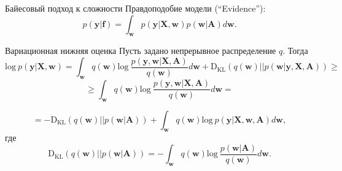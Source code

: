 \documentclass[10pt,pdf,utf8,russian,aspectratio=169]{beamer}
\begin{document}
\begin{frame}{Байесовый подход к сложности}
Правдоподобие модели (``Evidence''):
\[
	p(\mathbf{y}|\mathbf{f}) = \int_\mathbf{w} p(\mathbf{y}|\mathbf{X},\mathbf{w})p(\mathbf{w}|\mathbf{A}) d\mathbf{w}.
\]


\begin{figure}
  \centering
\label{fig:1}\qquad

\end{figure}


\end{frame}


\begin{frame}{Вариационная нижняя оценка}
Пусть задано непрерывное распределение $q$. 
Тогда 
$$
\text{log}~p(\mathbf{y}|\mathbf{X},\mathbf{w})  = \int_{\mathbf{w}} q(\mathbf{w})\text{log}~\frac{p(\mathbf{y},\mathbf{w}|\mathbf{X},\mathbf{A})}{q(\mathbf{w})}d\mathbf{w} + \text{D}_\text{KL}  (q(\mathbf{w})||p(\mathbf{w}| \mathbf{y}, \mathbf{X}, \mathbf{A})) \geq	
$$
$$
\geq \int_{\mathbf{w}} q(\mathbf{w})\text{log}~\frac{p(\mathbf{y},  \mathbf{w}|\mathbf{X}, \mathbf{A})}{q(\mathbf{w})}d\mathbf{w} =
$$

$$
= -\text{D}_\text{KL} (q(\mathbf{w})||p(\mathbf{w}|\mathbf{A})) + \int_{\mathbf{w}} q(\mathbf{w})\text{log}~{p(\mathbf{y}|\mathbf{X}, \mathbf{w},\mathbf{A})} d \mathbf{w},
$$
где $$\text{D}_\text{KL}(q(\mathbf{w})||p(\mathbf{w} |\mathbf{A})) = -\int_{\mathbf{w}} q(\mathbf{w})\text{log}~\frac{p(\mathbf{w} | \mathbf{A})}{q(\mathbf{w})}d\mathbf{w}.$$

\end{frame}
\end{document}
